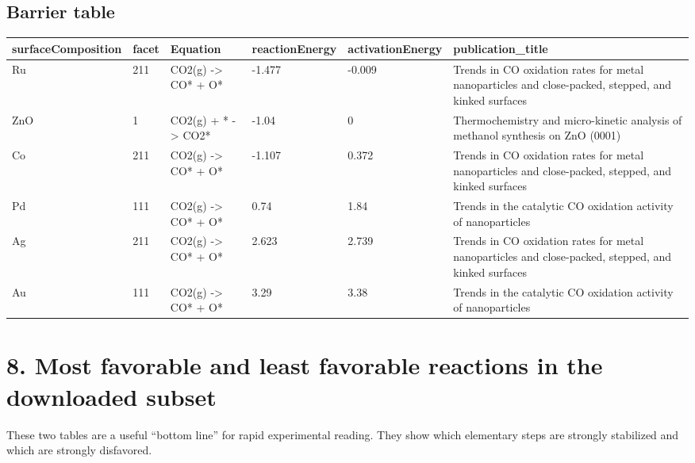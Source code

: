 \documentclass[11pt]{article}
\begin{document}
\subsection{Barrier table}
\begin{center}
\small
\begin{tabular}{| p{} | p{} | p{} | p{} | p{} | p{} |}
\hline
surfaceComposition & facet & Equation & reactionEnergy & activationEnergy & publication\_title \\
\hline
Ru & 211 & CO2(g) -> CO* + O* & -1.477 & -0.009 & Trends in CO oxidation rates for metal nanoparticles and close-packed, stepped, and kinked surfaces \\
\hline
ZnO & 1 & CO2(g) + * -> CO2* & -1.04 & 0 & Thermochemistry and micro-kinetic analysis of methanol synthesis on ZnO (0001) \\
\hline
Co & 211 & CO2(g) -> CO* + O* & -1.107 & 0.372 & Trends in CO oxidation rates for metal nanoparticles and close-packed, stepped, and kinked surfaces \\
\hline
Pd & 111 & CO2(g) -> CO* + O* & 0.74 & 1.84 & Trends in the catalytic CO oxidation activity of nanoparticles \\
\hline
Ag & 211 & CO2(g) -> CO* + O* & 2.623 & 2.739 & Trends in CO oxidation rates for metal nanoparticles and close-packed, stepped, and kinked surfaces \\
\hline
Au & 111 & CO2(g) -> CO* + O* & 3.29 & 3.38 & Trends in the catalytic CO oxidation activity of nanoparticles \\
\hline
\end{tabular}
\normalsize
\end{center}
\section{8. Most favorable and least favorable reactions in the downloaded subset}
These two tables are a useful ``bottom line'' for rapid experimental reading. They show which elementary steps are strongly stabilized and which are strongly disfavored.
\end{document}

